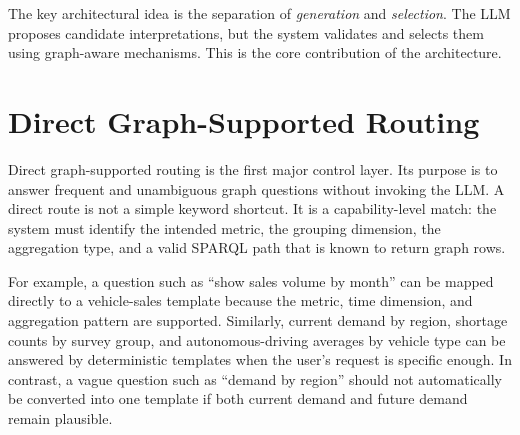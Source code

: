 \documentclass[
  12pt,
  english,
  oneside]{report}
\begin{document}
The key architectural idea is the separation of \emph{generation} and \emph{selection}. The LLM proposes candidate interpretations, but the system validates and selects them using graph-aware mechanisms. This is the core contribution of the architecture.

\section{Direct Graph-Supported Routing}
\label{sec:direct-graph-supported-routing}

Direct graph-supported routing is the first major control layer. Its purpose is to answer frequent and unambiguous graph questions without invoking the LLM. A direct route is not a simple keyword shortcut. It is a capability-level match: the system must identify the intended metric, the grouping dimension, the aggregation type, and a valid SPARQL path that is known to return graph rows.

For example, a question such as ``show sales volume by month'' can be mapped directly to a vehicle-sales template because the metric, time dimension, and aggregation pattern are supported. Similarly, current demand by region, shortage counts by survey group, and autonomous-driving averages by vehicle type can be answered by deterministic templates when the user's request is specific enough. In contrast, a vague question such as ``demand by region'' should not automatically be converted into one template if both current demand and future demand remain plausible.
\end{document}

